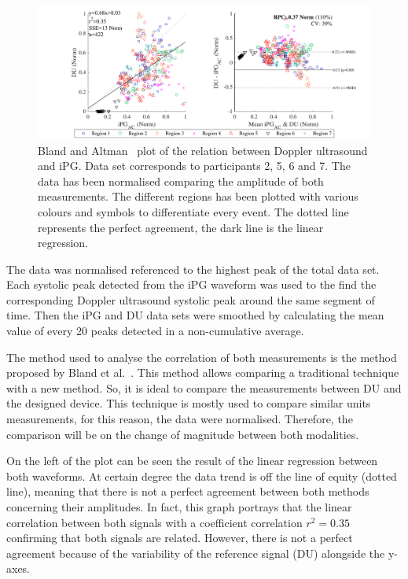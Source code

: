 \begin{figure}[!htpb]
	\includegraphics[width=1\textwidth,keepaspectratio]{figure2}    
	\caption[Bland and Altman plot of the relation between Doppler ultrasound and iPG]{Bland and Altman~\cite{bland1986statistical} plot of the relation between Doppler ultrasound and iPG. Data set corresponds to participants 2, 5, 6 and 7.  The data has been normalised comparing the amplitude of both measurements. The different regions has been plotted with various colours and symbols to differentiate every event. The dotted line represents the perfect agreement, the dark line is the linear regression.}
	\label{fig:corr FWUS}
\end{figure}

The data was normalised referenced to the highest peak of the total data set.  Each systolic peak detected from the iPG waveform was used to the find the corresponding Doppler ultrasound systolic peak around the same segment of time. Then the iPG and DU data sets were smoothed by calculating the mean value of every 20 peaks detected in a non-cumulative average.  

The method used to analyse the correlation of both measurements is the method proposed by Bland et al.~\cite{bland1986statistical}. This method allows comparing a traditional technique with a new method. So, it is ideal to compare the measurements between DU and the designed device. This technique is mostly used to compare similar units measurements, for this reason, the data were normalised. Therefore, the comparison will be on the change of magnitude between both modalities.

On the left of the plot can be seen the result of the linear regression between both waveforms. At certain degree the data trend is off the line of equity (dotted line), meaning that there is not a perfect agreement between both methods concerning their amplitudes. In fact, this graph portrays that the linear correlation between both signals with a coefficient correlation  $r^2 = 0.35$ confirming that both signals are related. However, there is not a perfect agreement because of the variability of the reference signal (DU) alongside the y-axes. 


